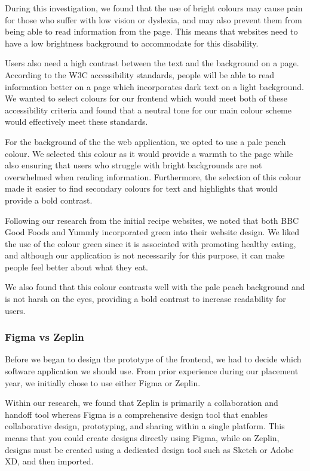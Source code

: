 \documentclass{article}
\begin{document}
    During this investigation, we found that the use of bright colours may cause pain for those who suffer with low vision or dyslexia, and may also prevent them from being able to read information from the page. This means that websites need to have a low brightness background to accommodate for this disability.
    
    Users also need a high contrast between the text and the background on a page. According to the W3C accessibility standards, people will be able to read information better on a page which incorporates dark text on a light background. We wanted to select colours for our frontend which would meet both of these accessibility criteria and found that a neutral tone for our main colour scheme would effectively meet these standards.
    
    For the background of the the web application, we opted to use a pale peach colour. We selected this colour as it would provide a warmth to the page while also ensuring that users who struggle with bright backgrounds are not overwhelmed when reading information. Furthermore, the selection of this colour made it easier to find secondary colours for text and highlights that would provide a bold contrast.

    Following our research from the initial recipe websites, we noted that both BBC Good Foods and Yummly incorporated green into their website design. We liked the use of the colour green since it is associated with promoting healthy eating, and although our application is not necessarily for this purpose, it can make people feel better about what they eat.

    We also found that this colour contrasts well with the pale peach background and is not harsh on the eyes, providing a bold contrast to increase readability for users.

    \subsubsection{Figma vs Zeplin}
    Before we began to design the prototype of the frontend, we had to decide which software application we should use. From prior experience during our placement year, we initially chose to use either Figma or Zeplin.

    Within our research, we found that Zeplin is primarily a collaboration and handoff tool whereas Figma is a comprehensive design tool that enables collaborative design, prototyping, and sharing within a single platform. This means that you could create designs directly using Figma, while on Zeplin, designs must be created using a dedicated design tool such as Sketch or Adobe XD, and then imported. 
    
\end{document}

